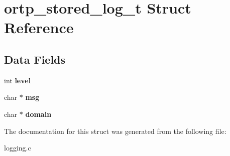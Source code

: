 \section{ortp\+\_\+stored\+\_\+log\+\_\+t Struct Reference}
\label{structortp__stored__log__t}
\subsection*{Data Fields}
\begin{DoxyCompactItemize}
\item 
\mbox{\label{structortp__stored__log__t_a15f11ee60a94ed93b1bfeb8e9dd599d8}} 
int {\bfseries level}
\item 
\mbox{\label{structortp__stored__log__t_ad914187896e5bac4af71b2f88a5e31c4}} 
char $\ast$ {\bfseries msg}
\item 
\mbox{\label{structortp__stored__log__t_ac560849bc119e8c6fb1b891c2a58e350}} 
char $\ast$ {\bfseries domain}
\end{DoxyCompactItemize}


The documentation for this struct was generated from the following file\+:\begin{DoxyCompactItemize}
\item 
logging.\+c\end{DoxyCompactItemize}
